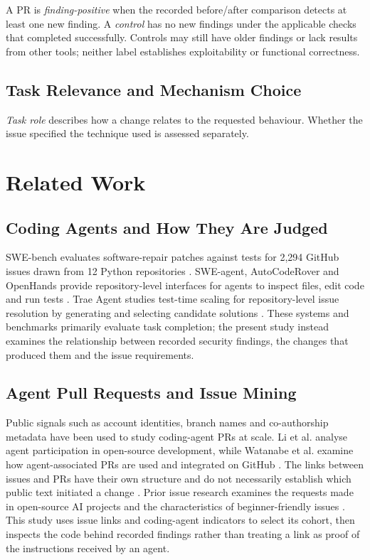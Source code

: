 \documentclass[acmsmall,screen,nonacm]{acmart}
\begin{document}
A PR is \emph{finding-positive} when the recorded before/after comparison detects at least one new finding. A \emph{control} has no new findings under the applicable checks that completed successfully. Controls may still have older findings or lack results from other tools; neither label establishes exploitability or functional correctness.

\subsection{Task Relevance and Mechanism Choice}

\emph{Task role} describes how a change relates to the requested behaviour. Whether the issue specified the technique used is assessed separately.

\section{Related Work}

\subsection{Coding Agents and How They Are Judged}

SWE-bench evaluates software-repair patches against tests for 2,294 GitHub issues drawn from 12 Python repositories \cite{b9}. SWE-agent, AutoCodeRover and OpenHands provide repository-level interfaces for agents to inspect files, edit code and run tests \cite{b22,b25,b20}. Trae Agent studies test-time scaling for repository-level issue resolution by generating and selecting candidate solutions \cite{b47}. These systems and benchmarks primarily evaluate task completion; the present study instead examines the relationship between recorded security findings, the changes that produced them and the issue requirements.

\subsection{Agent Pull Requests and Issue Mining}

Public signals such as account identities, branch names and co-authorship metadata have been used to study coding-agent PRs at scale. Li et al. analyse agent participation in open-source development, while Watanabe et al. examine how agent-associated PRs are used and integrated on GitHub \cite{b11,b21}. The links between issues and PRs have their own structure and do not necessarily establish which public text initiated a change \cite{b5}. Prior issue research examines the requests made in open-source AI projects and the characteristics of beginner-friendly issues \cite{b23,b26}. This study uses issue links and coding-agent indicators to select its cohort, then inspects the code behind recorded findings rather than treating a link as proof of the instructions received by an agent.
\end{document}
